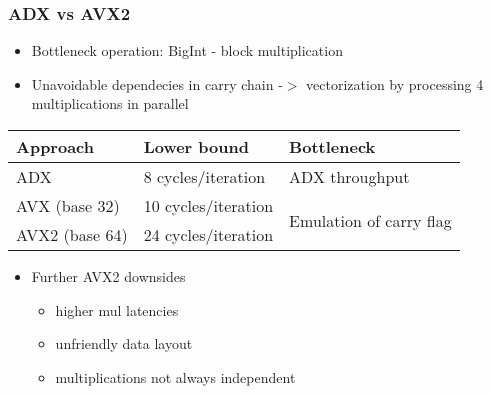 \begin{frame}
\frametitle{ADX vs AVX2}
\begin{itemize}
\item{Bottleneck operation: BigInt - block multiplication}
\item{Unavoidable dependecies in carry chain -$>$ vectorization by processing 4 multiplications in parallel}
\end{itemize}

\begin{tabular}{| p{3cm} | p{3cm} | p{4.5cm} |}
\hline
\textbf{Approach} & \textbf{Lower bound} & \textbf{Bottleneck}\\ \hline
ADX & 8 cycles/iteration & ADX throughput\\ \hline
AVX (base 32) & 10 cycles/iteration & \multirow{2}{3cm}{Emulation of carry flag} \\
AVX2 (base 64) & 24 cycles/iteration & \\
\hline
\end{tabular}

\begin{itemize}
\item{Further AVX2 downsides
\begin{itemize}
\item{higher mul latencies}
\item{unfriendly data layout}
\item{multiplications not always independent}
\end{itemize}
}
\end{itemize}

\end{frame}

